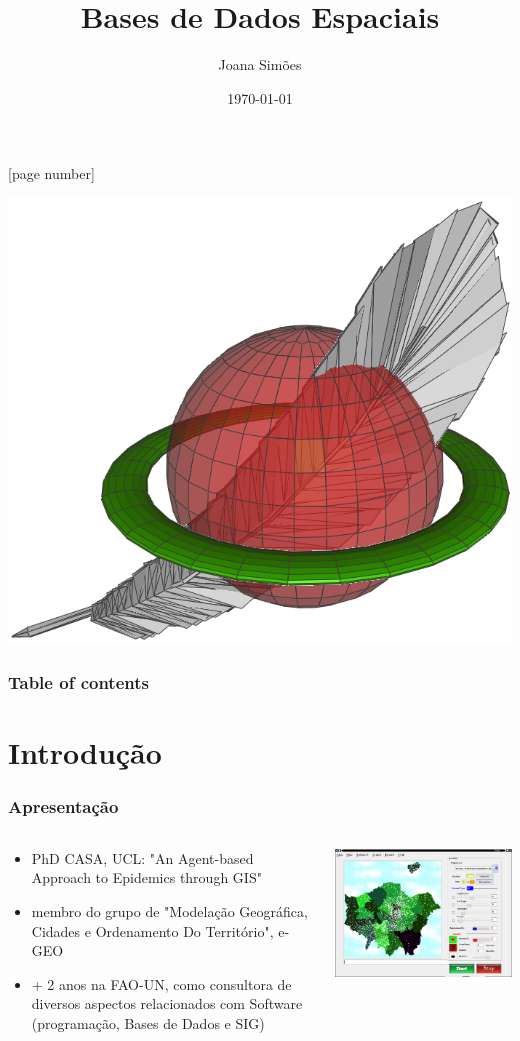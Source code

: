 \documentclass[hyperref={pdfpagelabels=true}]{beamer}
\title{Bases de Dados Espaciais}
\author{Joana Sim\~{o}es}
\date{\today}
\begin{document}
[page number]
\begin{frame}
\begin{titlepage}
\centering
  \includegraphics[width=.25\textwidth]{spatialite.png}
\end{titlepage}
\end{frame} 

\begin{frame}
\frametitle{Table of contents}
\tiny{
\tableofcontents}
\end{frame}
 
\section{Introdu\c{c}\~{a}o} 
\begin{frame}
\frametitle{Apresenta\c{c}\~{a}o}
\begin{columns}
  \begin{column}{7cm}
    \begin{itemize}
      \item<1-> PhD CASA, UCL: "An Agent-based Approach to Epidemics through GIS"
      \item<2-> membro do grupo de "Modela\c{c}\~{a}o Geogr\'{a}fica, Cidades e Ordenamento Do Territ\'{o}rio", e-GEO
      \item<3-> + 2 anos na FAO-UN, como consultora de diversos aspectos relacionados com Software (programa\c{c}\~{a}o, Bases de Dados e SIG)
      \end{itemize}
  \end{column}
  \begin{column}{10cm}
    \includegraphics[scale=0.4]{input1.png}
  \end{column}  
\end{columns}
\end{frame}
\end{document}
